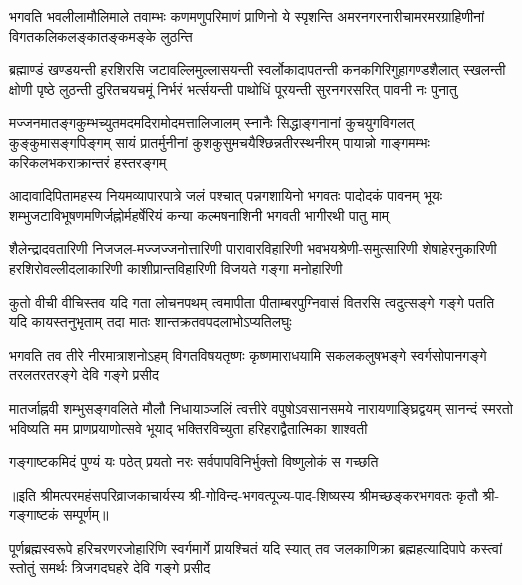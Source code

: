 

\fourlineindentedshloka
{भगवति भवलीलामौलिमाले तवाम्भः}
{कणमणुपरिमाणं प्राणिनो ये स्पृशन्ति}
{अमरनगरनारीचामरमरग्राहिणीनां}
{विगतकलिकलङ्कातङ्कमङ्के लुठन्ति}%

\fourlineindentedshloka
{ब्रह्माण्डं खण्डयन्ती हरशिरसि जटावल्लिमुल्लासयन्ती}
{स्वर्लोकादापतन्ती कनकगिरिगुहागण्डशैलात् स्खलन्ती}
{क्षोणी पृष्ठे लुठन्ती दुरितचयचमूं निर्भरं भर्त्सयन्ती}
{पाथोधिं पूरयन्ती सुरनगरसरित् पावनी नः पुनातु}%

\fourlineindentedshloka
{मज्जनमातङ्गकुम्भच्युतमदमदिरामोदमत्तालिजालम्}
{स्नानैः सिद्धाङ्गनानां कुचयुगविगलत् कुङ्कुमासङ्गपिङ्गम्}
{सायं प्रातर्मुनीनां कुशकुसुमचयैश्छिन्नतीरस्थनीरम्}
{पायान्नो गाङ्गमम्भः करिकलभकराक्रान्तरं हस्तरङ्गम्}%

\fourlineindentedshloka
{आदावादिपितामहस्य नियमव्यापारपात्रे जलं}
{पश्चात् पन्नगशायिनो भगवतः पादोदकं पावनम्}
{भूयः शम्भुजटाविभूषणमणिर्जह्नोर्महर्षेरियं}
{कन्या कल्मषनाशिनी भगवती भागीरथी पातु माम्}%

\fourlineindentedshloka
{शैलेन्द्रादवतारिणी निजजल-मज्जज्जनोत्तारिणी}
{पारावारविहारिणी भवभयश्रेणी-समुत्सारिणी}
{शेषाहेरनुकारिणी हरशिरोवल्लीदलाकारिणी}
{काशीप्रान्तविहारिणी विजयते गङ्गा मनोहारिणी}%

\fourlineindentedshloka
{कुतो वीची वीचिस्तव यदि गता लोचनपथम्}
{त्वमापीता पीताम्बरपुग्निवासं वितरसि}
{त्वदुत्सङ्गे गङ्गे पतति यदि कायस्तनुभृताम्}
{तदा मातः शान्तक्रतवपदलाभोऽप्यतिलघुः}%

\fourlineindentedshloka
{भगवति तव तीरे नीरमात्राशनोऽहम्}
{विगतविषयतृष्णः कृष्णमाराधयामि}
{सकलकलुषभङ्गे स्वर्गसोपानगङ्गे}
{तरलतरतरङ्गे देवि गङ्गे प्रसीद}%

\fourlineindentedshloka
{मातर्जाह्नवी शम्भुसङ्गवलिते मौलौ निधायाञ्जलिं}
{त्वत्तीरे वपुषोऽवसानसमये नारायणाङ्घ्रिद्वयम्}
{सानन्दं स्मरतो भविष्यति मम प्राणप्रयाणोत्सवे}
{भूयाद् भक्तिरविच्युता हरिहराद्वैतात्मिका शाश्वती}%

\twolineshloka
{गङ्गाष्टकमिदं पुण्यं यः पठेत् प्रयतो नरः}
{सर्वपापविनिर्भुक्तो विष्णुलोकं स गच्छति}%


॥इति श्रीमत्परमहंसपरिव्राजकाचार्यस्य श्री-गोविन्द-भगवत्पूज्य-पाद-शिष्यस्य
श्रीमच्छङ्करभगवतः कृतौ श्री-गङ्गाष्टकं सम्पूर्णम्॥

{पूर्णब्रह्मस्वरूपे हरिचरणरजोहारिणि स्वर्गमार्गे}
{प्रायश्चितं यदि स्यात् तव जलकाणिक्रा ब्रह्महत्यादिपापे}
{कस्त्वां स्तोतुं समर्थः त्रिजगदघहरे देवि गङ्गे प्रसीद}%